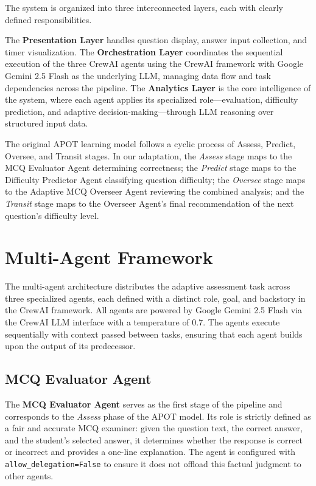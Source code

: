 \documentclass[conference]{IEEEtran}
\begin{document}
The system is organized into three interconnected layers, each with clearly defined responsibilities.

The \textbf{Presentation Layer} handles question display, answer input collection, and timer visualization. The \textbf{Orchestration Layer} coordinates the sequential execution of the three CrewAI agents using the CrewAI framework with Google Gemini 2.5 Flash as the underlying LLM, managing data flow and task dependencies across the pipeline. The \textbf{Analytics Layer} is the core intelligence of the system, where each agent applies its specialized role---evaluation, difficulty prediction, and adaptive decision-making---through LLM reasoning over structured input data.

The original APOT learning model \cite{outay2024} follows a cyclic process of Assess, Predict, Oversee, and Transit stages. In our adaptation, the \textit{Assess} stage maps to the MCQ Evaluator Agent determining correctness; the \textit{Predict} stage maps to the Difficulty Predictor Agent classifying question difficulty; the \textit{Oversee} stage maps to the Adaptive MCQ Overseer Agent reviewing the combined analysis; and the \textit{Transit} stage maps to the Overseer Agent's final recommendation of the next question's difficulty level.

\section{Multi-Agent Framework}

The multi-agent architecture distributes the adaptive assessment task across three specialized agents, each defined with a distinct role, goal, and backstory in the CrewAI framework. All agents are powered by Google Gemini 2.5 Flash via the CrewAI LLM interface with a temperature of 0.7. The agents execute sequentially with context passed between tasks, ensuring that each agent builds upon the output of its predecessor.

\subsection{MCQ Evaluator Agent}

The \textbf{MCQ Evaluator Agent} serves as the first stage of the pipeline and corresponds to the \textit{Assess} phase of the APOT model. Its role is strictly defined as a fair and accurate MCQ examiner: given the question text, the correct answer, and the student's selected answer, it determines whether the response is correct or incorrect and provides a one-line explanation. The agent is configured with \texttt{allow\_delegation=False} to ensure it does not offload this factual judgment to other agents.
\end{document}
